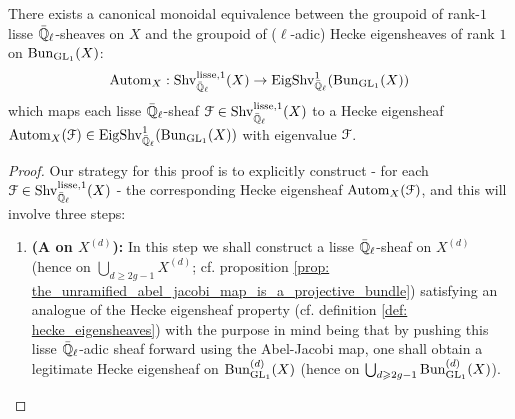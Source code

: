             \begin{theorem} \label{theorem: unramified_abelian_geometric_class_field_theory}
                There exists a canonical monoidal equivalence between the groupoid of rank-$1$ lisse $\bar{\mathbb{Q}}_{\ell}$-sheaves on $X$ and the groupoid of ($\ell$-adic) Hecke eigensheaves of rank $1$ on $\mathrm{Bun}_{\operatorname{GL}_1}(X)$:
                    $$\mathrm{Autom}_X: \mathrm{Shv}_{\bar{\mathbb{Q}}_{\ell}}^{\mathrm{lisse}, 1}(X) \to \mathrm{Eig}\mathrm{Shv}_{\bar{\mathbb{Q}}_{\ell}}^1(\mathrm{Bun}_{\operatorname{GL}_1}(X))$$
                which maps each lisse $\bar{\mathbb{Q}}_{\ell}$-sheaf $\mathcal{F} \in \mathrm{Shv}_{\bar{\mathbb{Q}}_{\ell}}^{\mathrm{lisse}, 1}(X)$ to a Hecke eigensheaf $\mathrm{Autom}_X(\mathcal{F}) \in \mathrm{Eig}\mathrm{Shv}_{\bar{\mathbb{Q}}_{\ell}}^1(\mathrm{Bun}_{\operatorname{GL}_1}(X))$ with eigenvalue $\mathcal{F}$.
            \end{theorem}
                \begin{proof}
                    Our strategy for this proof is to explicitly construct - for each $\mathcal{F} \in \mathrm{Shv}_{\bar{\mathbb{Q}}_{\ell}}^{\mathrm{lisse}, 1}(X)$ - the corresponding Hecke eigensheaf $\mathrm{Autom}_X(\mathcal{F})$, and this will involve three steps:
                        \begin{enumerate}
                            \item \textbf{(A  on $X^{(d)}$):} In this step we shall construct a lisse $\bar{\mathbb{Q}}_{\ell}$-sheaf on $X^{(d)}$ (hence on $\bigcup_{d \geq 2g - 1} X^{(d)}$; cf. proposition \ref{prop: the_unramified_abel_jacobi_map_is_a_projective_bundle}) satisfying an analogue of the Hecke eigensheaf property (cf. definition \ref{def: hecke_eigensheaves}) with the purpose in mind being that by pushing this lisse $\bar{\mathbb{Q}}_{\ell}$-adic sheaf forward using the Abel-Jacobi map, one shall obtain a legitimate Hecke eigensheaf on $\mathrm{Bun}_{\operatorname{GL}_1}^{(d)}(X)$ (hence on $\bigcup_{d \geqslant 2g - 1} \mathrm{Bun}_{\operatorname{GL}_1}^{(d)}(X)$).
                            

\end{enumerate}
\end{proof}
